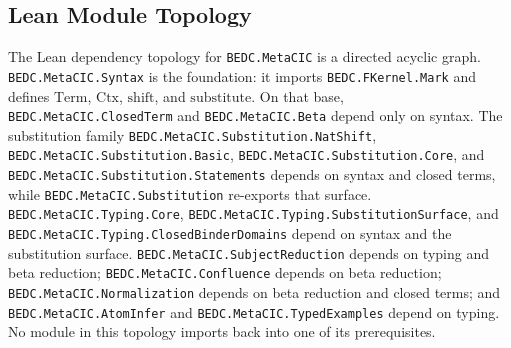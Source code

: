 \subsection{Lean Module Topology}\label{subsec:reconstruction-module-topology}

The Lean dependency topology for \texttt{BEDC.MetaCIC} is a directed acyclic
graph. \texttt{BEDC.MetaCIC.Syntax} is the foundation: it imports
\texttt{BEDC.FKernel.Mark} and defines $\mathrm{Term}$, $\mathrm{Ctx}$,
$\mathrm{shift}$, and $\mathrm{substitute}$. On that base,
\texttt{BEDC.MetaCIC.ClosedTerm} and \texttt{BEDC.MetaCIC.Beta} depend only
on syntax. The substitution family
\texttt{BEDC.MetaCIC.Substitution.NatShift},
\texttt{BEDC.MetaCIC.Substitution.Basic},
\texttt{BEDC.MetaCIC.Substitution.Core}, and
\texttt{BEDC.MetaCIC.Substitution.Statements} depends on syntax and closed
terms, while \texttt{BEDC.MetaCIC.Substitution} re-exports that surface.
\texttt{BEDC.MetaCIC.Typing.Core},
\texttt{BEDC.MetaCIC.Typing.SubstitutionSurface}, and
\texttt{BEDC.MetaCIC.Typing.ClosedBinderDomains} depend on syntax and the
substitution surface. \texttt{BEDC.MetaCIC.SubjectReduction} depends on
typing and beta reduction; \texttt{BEDC.MetaCIC.Confluence} depends on beta
reduction; \texttt{BEDC.MetaCIC.Normalization} depends on beta reduction and
closed terms; and \texttt{BEDC.MetaCIC.AtomInfer} and
\texttt{BEDC.MetaCIC.TypedExamples} depend on typing. No module in this
topology imports back into one of its prerequisites.
